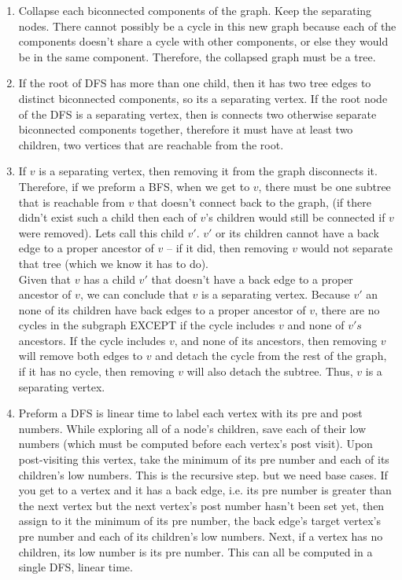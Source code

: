 \documentclass[11pt]{article}
\begin{document}
\begin{enumerate}
\begin{enumerate}
\item Collapse each biconnected components of the graph. Keep the separating nodes. There cannot possibly be a cycle in this new graph because each of the components doesn't share a cycle with other components, or else they would be in the same component. Therefore, the collapsed graph must be a tree.
\item If the root of DFS has more than one child, then it has two tree edges to distinct biconnected components, so its a separating vertex. If the root node of the DFS is a separating vertex, then is connects two otherwise separate biconnected components together, therefore it must have at least two children, two vertices that are reachable from the root.
\item If $v$ is a separating vertex, then removing it from the graph disconnects it. Therefore, if we preform a BFS, when we get to $v$, there must be one subtree that is reachable from $v$ that doesn't connect back to the graph, (if there didn't exist such a child then each of $v$'s children would still be connected if $v$ were removed). Lets call this child $v'$. $v'$ or its children cannot have a back edge to a proper ancestor of $v$ -- if it did, then removing $v$ would not separate that tree (which we know it has to do). \\
Given that $v$ has a child $v'$ that doesn't have a back edge to a proper ancestor of $v$, we can conclude that $v$ is a separating vertex. Because $v'$ an none of its children have back edges to a proper ancestor of $v$, there are no cycles in the subgraph EXCEPT if the cycle includes $v$ and none of $v's$ ancestors. If the cycle includes $v$, and none of its ancestors, then removing $v$ will remove both edges to $v$ and detach the cycle from the rest of the graph, if it has no cycle, then removing $v$ will also detach the subtree. Thus, $v$ is a separating vertex.\\
\item Preform a DFS is linear time to label each vertex with its pre and post numbers. While exploring all of a node's children, save each of their low numbers (which must be computed before each vertex's post visit). Upon post-visiting this vertex, take the minimum of its pre number and each of its children's low numbers. This is the recursive step. but we need base cases. If you get to a vertex and it has a back edge, i.e. its pre number is greater than the next vertex but the next vertex's post number hasn't been set yet, then assign to it the minimum of its pre number, the back edge's target vertex's pre number and each of its children's low numbers. Next, if a vertex has no children, its low number is its pre number. This can all be computed in a single DFS, linear time.

\end{enumerate}
\end{enumerate}
\end{document}

